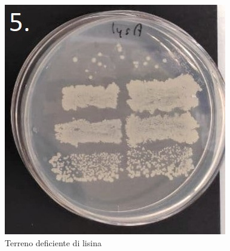 \begin{multicols}{3}
	\begin{figure}[H]
		\centering
		\includegraphics[scale=0.4]{./Pics/GeniAmbiente/lysA.jpg}
		\caption{Terreno deficiente di lisina}
		\label{fig6}
	\end{figure}

\end{multicols}
 
 
